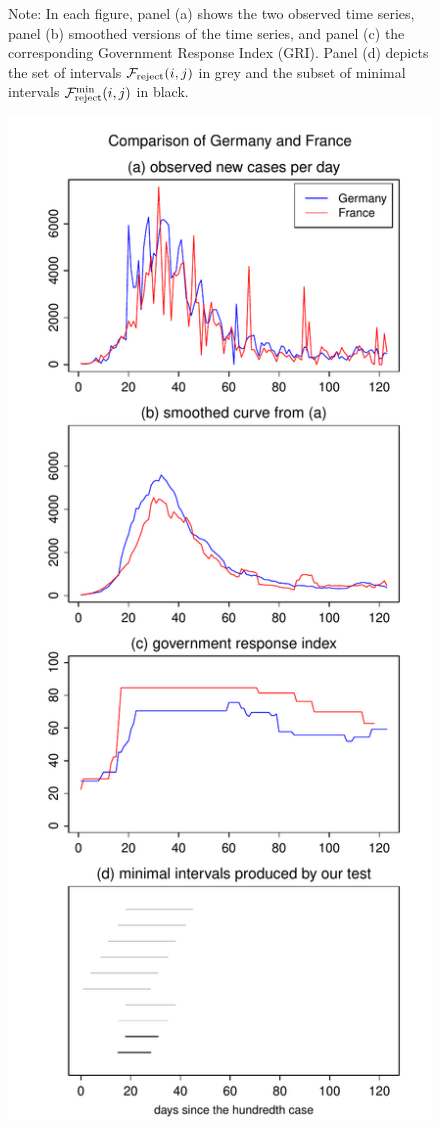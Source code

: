 \documentclass[a4paper,12pt]{article}
\numberwithin{equation}{section}
\begin{document}
\begin{figure}[p!]
\caption*{Note: In each figure, panel (a) shows the two observed time series, panel (b) smoothed versions of the time series, and panel (c) the corresponding Government Response Index (GRI). Panel (d) depicts the set of intervals $\mathcal{F}_{\text{reject}}(i,j)$ in grey and the subset of minimal intervals $\mathcal{F}_{\text{reject}}^{\text{min}}(i,j)$ in black.}
\end{figure}


\begin{figure}[p!]
\begin{minipage}[t]{0.49\textwidth}
\includegraphics[width=\textwidth]{plots/DEU_vs_FRA}

\end{minipage}
\end{figure}
\end{document}
